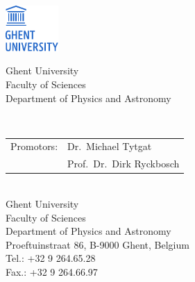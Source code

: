 \documentclass[10pt,a4paper,twoside,dutch,english,openright,leqno]{book}                %
\begin{document}

\clearpage{\pagestyle{empty}\cleardoublepage}
\thispagestyle{empty}

\normalsize

\noindent
\begin{minipage}{3cm}%
   \href{https://www.ugent.be/}{\includegraphics*[width=2cm]{UGent.pdf}}
 \end{minipage}\hfill
 \begin{minipage}{8cm}
 \raggedleft
 \textsf{Ghent University\\
 Faculty of Sciences\\
 Department of Physics and Astronomy}
 \end{minipage}
\\[2cm]

\vfill
\noindent \begin{tabular}{ @{} l l}
Promotors: & Dr.\ Michael Tytgat\\
 & Prof.\ Dr.\ Dirk Ryckbosch\\
\end{tabular}
\\[2cm]

\noindent Ghent University \\
\noindent Faculty of Sciences\\
[0.3cm]
\noindent Department of Physics and Astronomy \\
\noindent Proeftuinstraat 86, B-9000 Ghent, Belgium\\
[0.3cm]
\noindent Tel.: +32 9 264.65.28\\
\noindent Fax.: +32 9 264.66.97

\vfill
\end{document}
